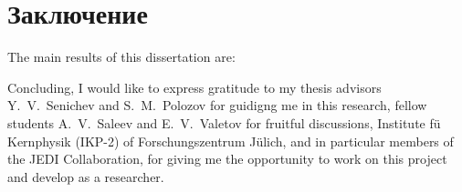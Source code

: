 \chapter*{Заключение}                       %


The main results of this dissertation are:


Concluding, I would like to express gratitude to my thesis advisors Y.~V.~Senichev and S.~M.~Polozov for guidigng me in this research, fellow students A.~V.~Saleev and E.~V.~Valetov for fruitful discussions, Institute f\"u Kernphysik (IKP-2) of Forschungszentrum J\"ulich, and in particular members of the JEDI Collaboration, for giving me the opportunity to work on this project and develop as a researcher.
